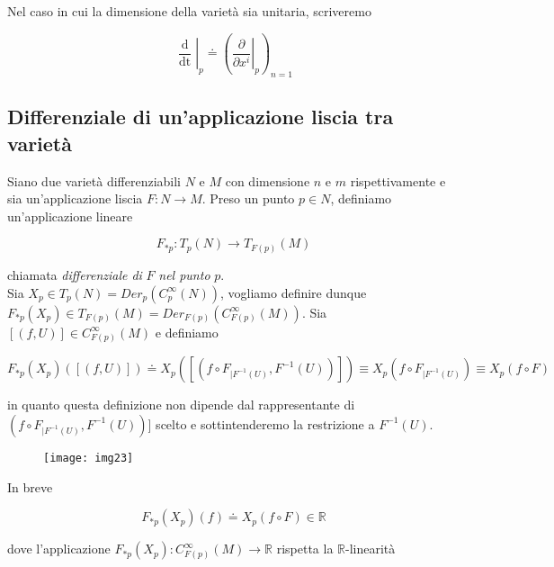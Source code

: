 Nel caso in cui la dimensione della varietà sia unitaria, scriveremo

\begin{equation}
	\left. \dfrac{\operatorname{d}}{\operatorname{dt}} \right|_{p} \doteq \left( \left. \dfrac{\partial}{\partial x^{i}} \right|_{p} \right)_{n=1}
\end{equation}

\subsection{Differenziale di un'applicazione liscia tra varietà}

Siano due varietà differenziabili $ N $ e $ M $ con dimensione $ n $ e $ m $ rispettivamente e sia un'applicazione liscia $ F : N \to M $. Preso un punto $ p \in N $, definiamo un'applicazione lineare

\begin{equation}
	F_{*p} : T_{p}(N) \to T_{F(p)}(M)
\end{equation}

chiamata \textit{differenziale di} $ F $ \textit{nel punto} $ p $.\\
Sia $ X_{p} \in T_{p}(N) = Der_{p}(C_{p}^{\infty}(N)) $, vogliamo definire dunque $ F_{*p}(X_{p}) \in T_{F(p)}(M) = Der_{F(p)}(C_{F(p)}^{\infty}(M)) $. Sia $ [(f,U)] \in C_{F(p)}^{\infty}(M) $ e definiamo

\begin{equation}
	 F_{*p}(X_{p})([(f,U)]) \doteq X_{p}([(f \circ F_{\mid F^{-1}(U)},F^{-1}(U))]) \equiv X_{p}(f \circ F_{\mid F^{-1}(U)}) \equiv X_{p}(f \circ F)
\end{equation}

in quanto questa definizione non dipende dal rappresentante di $ (f \circ F_{\mid F^{-1}(U)},F^{-1}(U))] $ scelto e sottintenderemo la restrizione a $ F^{-1}(U) $.

\begin{figure}[H]
	\centering
	\texttt{[image: img23]}
\end{figure}

In breve

\begin{equation}
	F_{*p}(X_{p})(f) \doteq X_{p}(f \circ F) \in \mathbb{R}
\end{equation}

dove l'applicazione $ F_{*p}(X_{p}) : C_{F(p)}^{\infty}(M) \to \mathbb{R} $ rispetta la $ \mathbb{R} $-linearità

